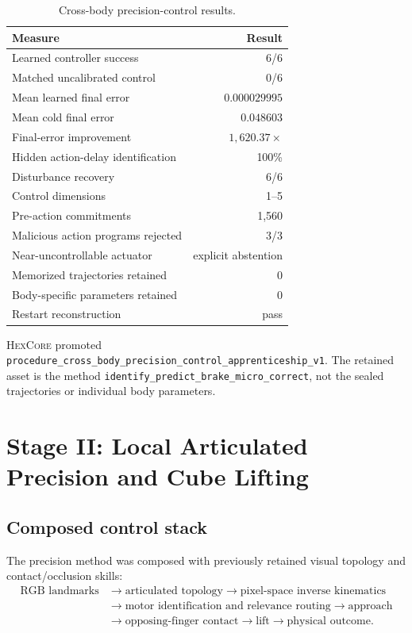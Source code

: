 \documentclass[11pt,a4paper]{article}
\newcommand{\HexCore}{\textsc{HexCore}}
\begin{document}
\begin{table}[H]
\centering
\caption{Cross-body precision-control results.}
\begin{tabular}{lr}
\toprule
Measure & Result \\
\midrule
Learned controller success & 6/6 \\
Matched uncalibrated control & 0/6 \\
Mean learned final error & $0.000029995$ \\
Mean cold final error & $0.048603$ \\
Final-error improvement & $1{,}620.37\times$ \\
Hidden action-delay identification & 100\% \\
Disturbance recovery & 6/6 \\
Control dimensions & 1--5 \\
Pre-action commitments & 1,560 \\
Malicious action programs rejected & 3/3 \\
Near-uncontrollable actuator & explicit abstention \\
Memorized trajectories retained & 0 \\
Body-specific parameters retained & 0 \\
Restart reconstruction & pass \\
\bottomrule
\end{tabular}
\end{table}

\HexCore{} promoted
\texttt{procedure\_cross\_body\_precision\_control\_apprenticeship\_v1}.
The retained asset is the method
\texttt{identify\_predict\_brake\_micro\_correct}, not the sealed trajectories
or individual body parameters.

\section{Stage II: Local Articulated Precision and Cube Lifting}

\subsection{Composed control stack}

The precision method was composed with previously retained visual topology and
contact/occlusion skills:
\begin{equation}
\begin{split}
\text{RGB landmarks}
&\rightarrow \text{articulated topology}
\rightarrow \text{pixel-space inverse kinematics} \\
&\rightarrow \text{motor identification and relevance routing}
\rightarrow \text{approach} \\
&\rightarrow \text{opposing-finger contact}
\rightarrow \text{lift}
\rightarrow \text{physical outcome}.
\end{split}
\label{eq:articulated-loop}
\end{equation}
\end{document}
